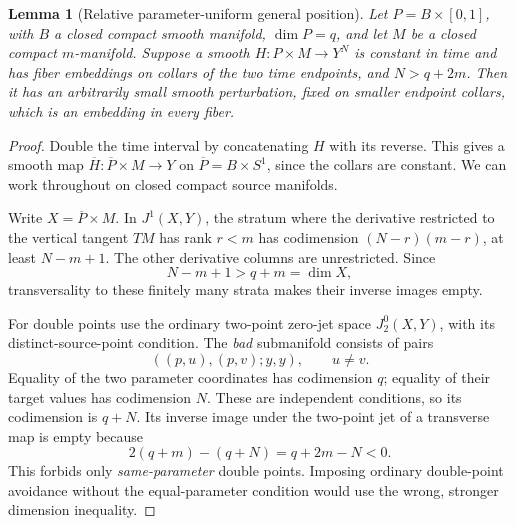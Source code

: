 \documentclass[11pt]{article}
\newtheorem{lemma}[theorem]{Lemma}
\begin{document}
\begin{lemma}[Relative parameter-uniform general position]
\label{lem:relative}
Let \(P=B\times[0,1]\), with \(B\) a closed compact smooth
manifold, \(\dim P=q\), and let \(M\) be a closed compact
\(m\)-manifold. Suppose a smooth
\(H:P\times M\to Y^N\) is constant in time and has fiber embeddings
on collars of the two time endpoints, and \(N>q+2m\).
Then it has an arbitrarily small smooth perturbation, fixed on
smaller endpoint collars, which is an embedding in every fiber.
\end{lemma}
\begin{proof}
Double the time interval by concatenating \(H\) with
its reverse. This gives a smooth map
\(\overline H:\overline P\times M\to Y\) on
\(\overline P=B\times S^1\), since the collars are constant.
We can work throughout on closed compact source manifolds.

Write \(X=\overline P\times M\). In \(J^1(X,Y)\), the stratum
where the derivative restricted to the vertical tangent \(TM\)
has rank \(r<m\) has codimension
\((N-r)(m-r)\), at least \(N-m+1\).
The other derivative columns are unrestricted. Since
\[
 N-m+1>q+m=\dim X ,
 \tag{18}
\]
transversality to these finitely many strata makes their inverse
images empty.

For double points use the ordinary two-point zero-jet space
\(J_2^0(X,Y)\), with its distinct-source-point condition.
The \emph{bad} submanifold consists of pairs
\[
 ((p,u),(p,v);y,y),\qquad u\ne v .
 \]
Equality of the two parameter coordinates has codimension \(q\);
equality of their target values has codimension \(N\).
These are independent conditions, so its codimension is \(q+N\).
Its inverse image under the two-point jet of a transverse map is
empty because
\[
 2(q+m)-(q+N)=q+2m-N<0 .                          \tag{19}
\]
This forbids only \emph{same-parameter} double points.
Imposing ordinary double-point avoidance without the equal-parameter
condition would use the wrong, stronger dimension inequality.


\end{proof}
\end{document}
